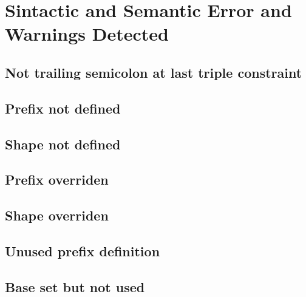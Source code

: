 \section{Sintactic and Semantic Error and Warnings Detected}

\subsection{Not trailing semicolon at last triple constraint}

\subsection{Prefix not defined}

\subsection{Shape not defined}

\subsection{Prefix overriden}

\subsection{Shape overriden}

\subsection{Unused prefix definition}

\subsection{Base set but not used}